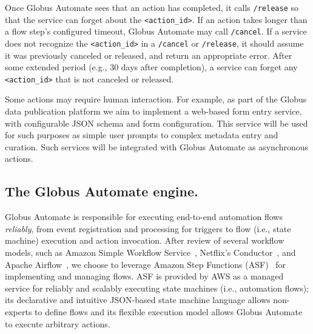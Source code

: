 \documentclass{aip-cp}
\newcommand\code[1]{{\tt \footnotesize #1}}
\newcommand\darkcode[1]{\code{#1}}
\begin{document}
Once Globus Automate sees that an action has completed, it calls \darkcode{/release} 
so that the service can forget about the \code{<action\_id>}.  
If an action takes longer than a flow step's configured timeout,
Globus Automate may call \darkcode{/cancel}. 
If a service does not recognize the \darkcode{<action\_id>} in a \darkcode{/cancel} or 
\darkcode{/release}, 
it should assume it was previously canceled or released, and return an appropriate error. 
After some extended period (e.g., 30 days after completion),
a service can forget any \code{<action\_id>} that is not canceled or released. 

Some actions may require human interaction.  For example, as part of 
the Globus data publication platform we aim to implement 
a web-based form entry service, 
with configurable JSON schema and form configuration. 
This service will be used for such purposes 
as simple user prompts to complex metadata entry and curation.
Such services will be integrated with Globus Automate as asynchronous actions.

\subsection{The Globus Automate engine.}
Globus Automate is responsible for executing end-to-end automation flows \emph{reliably}, 
from event registration and processing for triggers to
flow (i.e., state machine) execution and action invocation. 
After review of several workflow models, such as Amazon Simple
Workflow Service~\cite{AmazonSWF}, Netflix's Conductor~\cite{conductor}, and Apache 
Airflow~\cite{airflow}, 
we choose to leverage
Amazon Step Functions (ASF)~\cite{AmazonSteps} for implementing and managing flows.
ASF is provided by AWS as a managed service for reliably 
and scalably executing state machines (i.e., automation flows);
its declarative and intuitive JSON-based state machine language allows non-experts
to define
flows and its flexible execution model allows Globus Automate
to execute arbitrary actions.
\end{document}
